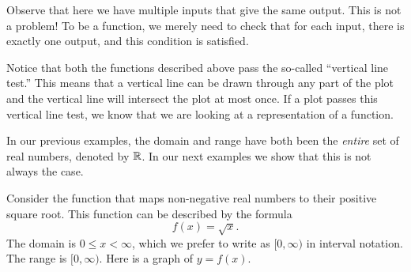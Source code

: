 \documentclass{ximera}
\begin{document}
\begin{example}
\begin{image}
\end{image}
Observe that here we have multiple inputs that give
the same output.  This is not a problem! To be a function, we
merely need to check that for each input, there is exactly one output,
and this condition is satisfied.
\end{example}


Notice that both the functions described above pass the so-called
``vertical line test.''  This means that a vertical line can be drawn
through any part of the plot and the vertical line will intersect
the plot at most once.  If a plot passes this vertical line test, we know that
we are looking at a representation of a function.

In our previous examples, the domain and range have both been the
\textit{entire} set of real numbers, denoted by $\mathbb R$. In our next
examples we show that this is not always the case.

\begin{example}
Consider the function that maps non-negative real numbers to their
positive square root. This function can be described by the
formula
\[
f(x) = \sqrt{x}.
\]
The domain is $0\le x<\infty$, which we prefer to write as
$[0,\infty)$ in interval notation. The range is $[0,\infty)$.  Here is
    a graph of $y=f(x)$.
  
\begin{image}
\end{image}
\end{example}
\end{document}
